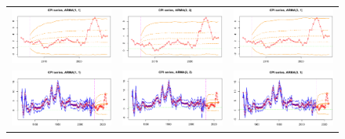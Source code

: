 \documentclass{Configuration_Files/PoliMi3i_thesis}
\begin{document}
\begin{figure}[H]
  \centering
  \begin{tabular}{@{}ccc@{}}
    \includegraphics[angle=90,width=0.3\linewidth]{CPI_ZARMA(1,1).png} &
    \includegraphics[angle=90,width=0.302\linewidth]{CPI_ZARMA(2,2).png} &
    \includegraphics[angle=90,width=0.305\linewidth]{CPI_ZARMA(3,1).png} \\
    \includegraphics[angle=90,width=0.3\linewidth]{CPI_FARMA(1,1).png} &
    \includegraphics[angle=90,width=0.3\linewidth]{CPI_FARMA(2,2).png} &
    \includegraphics[angle=90,width=0.29\linewidth]{CPI_FARMA(3,1).png}
  \end{tabular}
\end{figure}
\newpage
\end{document}
